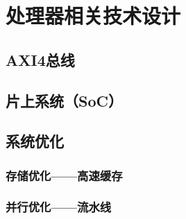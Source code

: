 

\chapter{处理器相关技术设计}

\section{AXI4总线}

\section{片上系统（SoC）}

\section{系统优化}

\subsection{存储优化——高速缓存}

\subsection{并行优化——流水线}